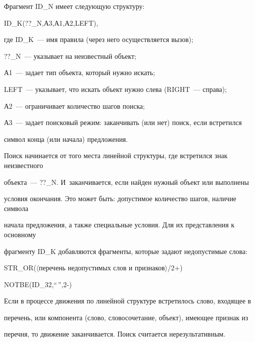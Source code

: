 Фрагмент ID\_N имеет следующую структуру:





{\sf          ID\_K(??\_N,А3,А1,А2,LEFT)}, 





\noindent


      где {\sf ID\_K}~--- имя правила (через него осуществляется вызов);


{\sf   ??\_N}~--- указывает на неизвестный объект;


{\sf      А1}~--- задает тип объекта, который нужно искать;  


      {\sf LEFT}~--- указывает, что искать объект нужно слева ({\sf RIGHT}~--- справа);


{\sf      А2}~--- ограничивает количество шагов поиска;


      {\sf А3}~--- задает поисковый режим: заканчивать (или нет) поиск, если встретился 


символ конца (или начала) предложения.     





Поиск начинается от того места линейной структуры, где встретился знак неизвестного 


объекта~---  {\sf ??\_N}. И~заканчивается, если найден нужный объект или выполнены 


условия окончания. Это может быть: допустимое количество шагов, наличие символа 


начала предложения, а также специальные условия. Для их представления к основному 


фрагменту {\sf ID\_K} добавляются фрагменты, которые задают недопустимые слова:   


      


\noindent


{\sf     STR\_OR($\langle$перечень недопустимых слов и признаков$\rangle$/2+) 


NOTBE(ID\_32,``\,'',2-)}





   Если в процессе движения по линейной структуре встретилось слово, входящее в 


перечень, или компонента (слово, словосочетание, объект), имеющее признак из 


перечня, то движение заканчивается. Поиск считается нерезультативным.





